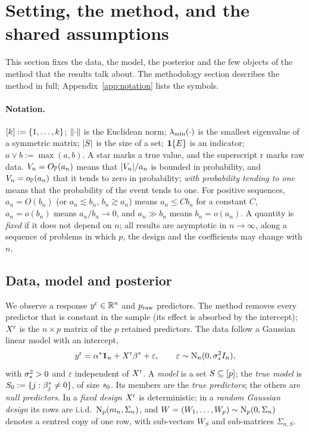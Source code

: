 \section{Setting, the method, and the shared assumptions}\label{sec:setting}

This section fixes the data, the model, the posterior and the few objects of the method that the results talk about.
The methodology section describes the method in full; Appendix~\ref{app:notation} lists the symbols.

\paragraph{Notation.} $[k]:=\{1,\dots,k\}$; $\lVert \cdot\rVert$ is the Euclidean norm; $\lambda_{\min}(\cdot)$ is the smallest
eigenvalue of a symmetric matrix; $\lvert S\rvert$ is the size of a set; $\mathbf{1}\{E\}$ is an indicator; $a\vee b:=\max(a,b)$. A star marks a true value,
and the superscript $\mathrm r$ marks raw data. $V_n=O_{\mathbb{P}}(a_n)$ means that $\lvert V_n\rvert/a_n$ is bounded in probability, and $V_n=o_{\mathbb{P}}(a_n)$ that it tends to zero in
probability; \emph{with probability tending to one} means that the probability of the event tends to one. For positive
sequences, $a_n=O(b_n)$ (or $a_n\lesssim b_n$, $b_n\gtrsim a_n$) means $a_n\le Cb_n$ for a constant $C$, $a_n=o(b_n)$
means $a_n/b_n\to0$, and $a_n\gg b_n$ means $b_n=o(a_n)$. A quantity is \emph{fixed} if
it does not depend on $n$; all results are asymptotic in $n\to\infty$, along a sequence of problems in which $p$, the
design and the coefficients may change with $n$.

\subsection{Data, model and posterior}\label{sec:model}

We observe a response $y^{\mathrm r}\in\mathbb{R}^n$ and $p_{\mathrm{raw}}$ predictors. The method removes every predictor that is constant in the
sample (its effect is absorbed by the intercept); $X^{\mathrm r}$ is the $n\times p$ matrix of the $p$ retained predictors. The data
follow a Gaussian linear model with an intercept,
\begin{equation}\label{eq:model}
  y^{\mathrm r}=\alpha^*\mathbf{1}_n+X^{\mathrm r}\beta^*+\varepsilon,\qquad \varepsilon\sim\mathrm{N}_n(0,\sigma_*^2I_n),
\end{equation}
with $\sigma_*^2>0$ and $\varepsilon$ independent of $X^{\mathrm r}$. A \emph{model} is a set $S\subseteq[p]$; the \emph{true
model} is $S_0:=\{j:\beta^*_j\neq0\}$, of size $s_0$. Its members are the \emph{true predictors}; the others are
\emph{null predictors}. In a \emph{fixed design} $X^{\mathrm r}$ is deterministic; in a \emph{random Gaussian design} its rows are
i.i.d.\ $\mathrm{N}_p(m_n,\Sigma_n)$, and $W=(W_1,\dots,W_p)\sim\mathrm{N}_p(0,\Sigma_n)$ denotes a centred copy of one row, with
sub-vectors $W_S$ and sub-matrices $\Sigma_{n,S}$.

